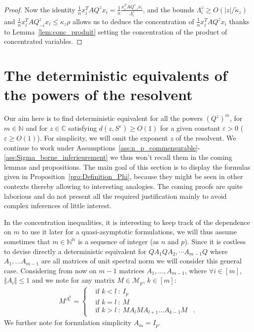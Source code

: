 \documentclass[a4papaer, titlepage]{book}
\begin{document}
\begin{proof}
Now the identity $\frac{1}{n}x_i^T AQ^zx_i 
  = \frac{1}{n}\frac{x_i^T AQ^z_{-i}x_i}{\Lambda_i^z}$, and the bounds $\Lambda_i^z \geq O(|z|/\check \kappa_z)$ and $\frac{1}{n}x_i^T AQ_{-i}^zx_i \leq \kappa_z \rho$ allows us to deduce the concentration of $\frac{1}{n}x_i^T AQ^zx_i$ thanks to Lemma~\ref{lem:conc_produit} setting the concentration of the product of concentrated variables.
\end{proof}




\section{The deterministic equivalents of the powers of the resolvent}\label{sse:det_equ_puiss_Q}

Our aim here is to find  deterministic equivalent for all the powers $(Q^z)^m$, for $ m\in \mathbb N$ and for $z \in \mathbb C$ satisfying $d(z,S^\varepsilon)\geq O(1)$ for a given constant $\varepsilon>0$ ($\varepsilon \geq O(1)$). 
For simplicity, we will omit the exponent $z$ of the resolvent. We continue to work under Assumptions~\ref{ass:n_p_commensurable}-\ref{ass:Sigma_borne_inferieurement} we thus won't recall them in the coming lemmas and propositions. The main goal of this section is to display the formulas given in Proposition~\ref{pro:Definition_Phi}, because they might be seen in other contexts thereby allowing to interesting analogies. The coming proofs are quite laborious and do not present all the required justification mainly to avoid complex inferences of little interest.

In the concentration inequalities, it is interesting to keep track of the dependence on $m$ to use it later for a quasi-asymptotic formulations, we will thus assume sometimes that $m\in \mathbb N^\mathbb N$ is a sequence of integer (as $n$ and $p$).
Since it is costless to devise directly a deterministic equivalent for $QA_1QA_2,\cdots A_{m-1}Q$ where $A_1,\ldots A_{m-1}$ are all matrices of unit spectral norm we will consider this general case.
Considering from now on $m-1$ matrices $A_1, \ldots, A_{m-1}$, where $\forall i\in [m]$, $\left\Vert A_i\right\Vert\leq 1$ and we note for any matrix $M\in \mathcal M_p$, $k \in [m]$:           
\begin{align*}
M^{A_l^{k}}=
\left\{\begin{aligned}
  &\text{if } k<l \ : \ I_p\\
  &\text{if } k=l \ : \ M \\
  &\text{if } k > l  \ : \  MA_lMA_{l+1}\ldots A_{k-1}M&.
\end{aligned}\right.
\end{align*}
We further note for formulation simplicity $A_m = I_p$.
\end{document}

